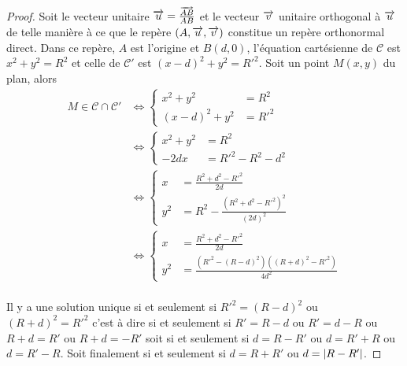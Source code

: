 \begin{proof}
    Soit le vecteur unitaire \(\overrightarrow{u} = \frac{\overrightarrow{AB}}{AB}\) et le vecteur 
    \(\overrightarrow{v}\) unitaire orthogonal à \(\overrightarrow{u}\) de telle manière à ce que le repère 
    \((A , \overrightarrow{u} , \overrightarrow{v})\) constitue un repère orthonormal direct. Dans ce repère, 
    \(A\) est l'origine et \(B(d , 0)\), l'équation cartésienne de \(\mathcal{C}\) 
    est \(x^2 + y^2 = R^2\) et celle de \(\mathcal{C}'\) est \((x - d)^2 + y^2 = 
    R'^2\). Soit un point \(M(x , y)\) du plan, alors
    \begin{align}
        M \in \mathcal{C} \cap \mathcal{C}' &\iff \begin{cases}
            x^2 + y^2& = R^2 \\ (x - d)^2 + y^2 & = R'^2
        \end{cases}\\
                                            &\iff \begin{cases}
                                                x^2 + y^2& = R^2 \\ -2dx & = 
                                                R'^2 - R^2 - d^2
                                            \end{cases}\\
                                            &\iff \begin{cases} x& = \frac{R^2 + 
                                                d^2 - R'^2}{2d} \\
                                                y^2& = R^2 - \frac{(R^2 + 
                                                d^2 - R'^2)^2}{(2d)^2}
                                                \end{cases}\\
                                            &\iff \begin{cases} x& = \frac{R^2 + 
                                                d^2 - R'^2}{2d} \\ y^2& = 
                                                \frac{(R'^2 - (R - d)^2)((R + 
                                                d)^2 - R'^2)}{4d^2}
                                            \end{cases}\\
    \end{align}

    Il y a une solution unique si et seulement si \(R'^2 = (R - d)^2\) ou \((R + 
    d)^2 = R'^2\) c'est à dire si et seulement si \(R' = R - d\) ou \(R' = d - R\) 
    ou \(R + d = R'\) ou \(R + d = -R'\) soit si et seulement si \(d = R - R'\) ou 
    \(d = R' + R\) ou \(d = R'-R\). Soit finalement si et seulement si \(d = R + 
    R'\) ou \(d = \left\lvert R - R'\right\rvert\).


\end{proof}
